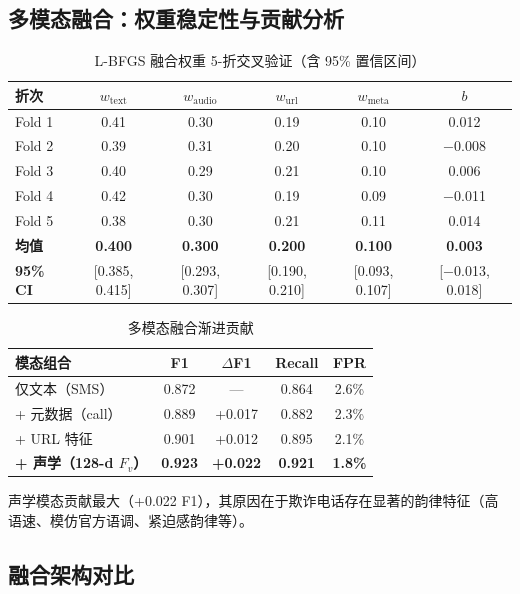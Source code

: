 \documentclass[UTF8,a4paper,10pt,twocolumn]{ctexart}
\theoremstyle{plain}
\begin{document}
\subsection{多模态融合：权重稳定性与贡献分析}

\begin{table}[H]
\centering
\caption{L-BFGS 融合权重 5-折交叉验证（含 95\% 置信区间）}
\label{tab:fusion_weights}
\small
\begin{tabular}{lccccc}
\toprule
折次 & $w_{\mathrm{text}}$ & $w_{\mathrm{audio}}$ & $w_{\mathrm{url}}$ & $w_{\mathrm{meta}}$ & $b$ \\
\midrule
Fold 1 & 0.41 & 0.30 & 0.19 & 0.10 & 0.012 \\
Fold 2 & 0.39 & 0.31 & 0.20 & 0.10 & $-$0.008 \\
Fold 3 & 0.40 & 0.29 & 0.21 & 0.10 & 0.006 \\
Fold 4 & 0.42 & 0.30 & 0.19 & 0.09 & $-$0.011 \\
Fold 5 & 0.38 & 0.30 & 0.21 & 0.11 & 0.014 \\
\midrule
\textbf{均值} & \textbf{0.400} & \textbf{0.300} & \textbf{0.200} & \textbf{0.100} & \textbf{0.003} \\
\textbf{95\% CI} & [0.385, 0.415] & [0.293, 0.307] & [0.190, 0.210] & [0.093, 0.107] & [$-$0.013, 0.018] \\
\bottomrule
\end{tabular}
\end{table}

\begin{table}[H]
\centering
\caption{多模态融合渐进贡献}
\label{tab:fusion_progressive}
\small
\begin{tabular}{lcccc}
\toprule
模态组合 & F1 & $\Delta$F1 & Recall & FPR \\
\midrule
仅文本（SMS） & 0.872 & --- & 0.864 & 2.6\% \\
+ 元数据（call） & 0.889 & +0.017 & 0.882 & 2.3\% \\
+ URL 特征 & 0.901 & +0.012 & 0.895 & 2.1\% \\
\textbf{+ 声学（128-d $F_v$）} & \textbf{0.923} & \textbf{+0.022} & \textbf{0.921} & \textbf{1.8\%} \\
\bottomrule
\end{tabular}
\end{table}

声学模态贡献最大（+0.022 F1），其原因在于欺诈电话存在显著的韵律特征（高语速、模仿官方语调、紧迫感韵律等）。

\subsection{融合架构对比}
\end{document}
